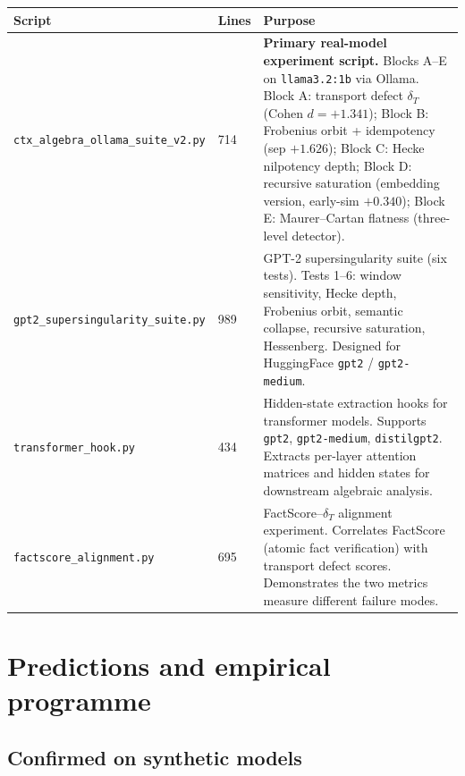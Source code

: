 \documentclass[11pt]{amsart}
\theoremstyle{definition}
\begin{document}
\begin{center}
\renewcommand{\arraystretch}{1.2}
\small
\begin{tabular}{@{}p{4.2cm}p{1.0cm}p{8.2cm}@{}}
\toprule
Script & Lines & Purpose \\
\midrule
\texttt{ctx\_algebra\_ollama\_suite\_v2.py} & 714 &
  \textbf{Primary real-model experiment script.}
  Blocks A--E on \texttt{llama3.2:1b} via Ollama.
  Block A: transport defect $\delta_T$ (Cohen $d=+1.341$);
  Block B: Frobenius orbit + idempotency (sep $+1.626$);
  Block C: Hecke nilpotency depth;
  Block D: recursive saturation (embedding version, early-sim $+0.340$);
  Block E: Maurer--Cartan flatness (three-level detector). \\
\texttt{gpt2\_supersingularity\_suite.py} & 989 &
  GPT-2 supersingularity suite (six tests).
  Tests 1--6: window sensitivity, Hecke depth, Frobenius orbit,
  semantic collapse, recursive saturation, Hessenberg.
  Designed for HuggingFace \texttt{gpt2} / \texttt{gpt2-medium}. \\
\texttt{transformer\_hook.py} & 434 &
  Hidden-state extraction hooks for transformer models.
  Supports \texttt{gpt2}, \texttt{gpt2-medium}, \texttt{distilgpt2}.
  Extracts per-layer attention matrices and hidden states for
  downstream algebraic analysis. \\
\texttt{factscore\_alignment.py} & 695 &
  FactScore--$\delta_T$ alignment experiment.
  Correlates FactScore (atomic fact verification) with
  transport defect scores. Demonstrates the two metrics
  measure different failure modes. \\
\bottomrule
\end{tabular}
\end{center}

\section{Predictions and empirical programme}
\label{sec:predictions}

\subsection{Confirmed on synthetic models}
\end{document}
